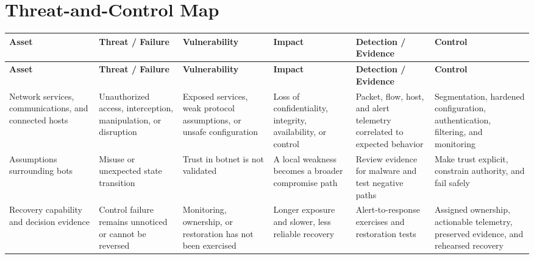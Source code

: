 \documentclass[11pt,letterpaper]{article}
\begin{document}
\section*{Threat-and-Control Map}
\begingroup\scriptsize\setlength{\tabcolsep}{2pt}
\begin{longtable}{>{\raggedright\arraybackslash}p{}>{\raggedright\arraybackslash}p{}>{\raggedright\arraybackslash}p{}>{\raggedright\arraybackslash}p{}>{\raggedright\arraybackslash}p{}>{\raggedright\arraybackslash}p{}}
\toprule\rowcolor{Navy}\color{white}\textbf{Asset} & \color{white}\textbf{Threat / Failure} & \color{white}\textbf{Vulnerability} & \color{white}\textbf{Impact} & \color{white}\textbf{Detection / Evidence} & \color{white}\textbf{Control}\\\midrule
\endfirsthead
\toprule\rowcolor{Navy}\color{white}\textbf{Asset} & \color{white}\textbf{Threat / Failure} & \color{white}\textbf{Vulnerability} & \color{white}\textbf{Impact} & \color{white}\textbf{Detection / Evidence} & \color{white}\textbf{Control}\\\midrule
\endhead
Network services, communications, and connected hosts & Unauthorized access, interception, manipulation, or disruption & Exposed services, weak protocol assumptions, or unsafe configuration & Loss of confidentiality, integrity, availability, or control & Packet, flow, host, and alert telemetry correlated to expected behavior & Segmentation, hardened configuration, authentication, filtering, and monitoring\\\midrule
Assumptions surrounding bots & Misuse or unexpected state transition & Trust in botnet is not validated & A local weakness becomes a broader compromise path & Review evidence for malware and test negative paths & Make trust explicit, constrain authority, and fail safely\\\midrule
Recovery capability and decision evidence & Control failure remains unnoticed or cannot be reversed & Monitoring, ownership, or restoration has not been exercised & Longer exposure and slower, less reliable recovery & Alert-to-response exercises and restoration tests & Assigned ownership, actionable telemetry, preserved evidence, and rehearsed recovery\\\midrule
\bottomrule
\end{longtable}
\endgroup
\end{document}
